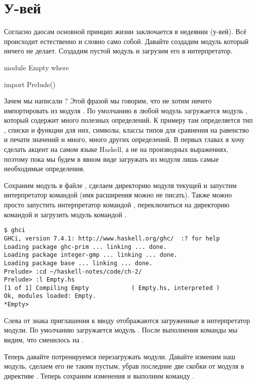 \section{У-вей}

Согласно даосам основной принцип жизни заключается в недеянии (у-вей).
Всё происходит естественно и словно само собой. Давайте создадим модуль
который ничего не делает. Создадим пустой модуль и загрузим его в
интерпретатор.


\begin{code}
module Empty where

import Prelude()
\end{code}

Зачем мы написали ? Этой фразой мы говорим, что не
хотим ничего импортировать из модуля . По умолчанию в любой
модуль загружается модуль , который содержит много полезных
определений. К примеру там определяется тип , списки и функции
для них, символы, классы типов для сравнения на равенство и печати
значений и много, много других определений. В первых главах я хочу
сделать акцент на самом языке Haskell, а не на производных выражениях,
поэтому пока мы будем в явном виде загружать из модуля  лишь
самые необходимые определения.

Сохраним модуль в файле , сделаем директорию модуля текущей
и запустим интерпретатор командой  (имя расширения можно
не писать). Также можно просто запустить интерпретатор командой
, переключиться на директорию командой  и загрузить
модуль командой .


\begin{verbatim}
$ ghci
GHCi, version 7.4.1: http://www.haskell.org/ghc/  :? for help
Loading package ghc-prim ... linking ... done.
Loading package integer-gmp ... linking ... done.
Loading package base ... linking ... done.
Prelude> :cd ~/haskell-notes/code/ch-2/
Prelude> :l Empty.hs 
[1 of 1] Compiling Empty            ( Empty.hs, interpreted )
Ok, modules loaded: Empty.
*Empty> 
\end{verbatim}

Слева от знака приглашения к вводу \In{>} отображаются загруженные в
интерпретатор модули. По умолчанию загружается модуль .
После выполнения команды  мы видим, что  сменилось на
.

Теперь давайте потренируемся перезагружать модули. Давайте изменим наш
модуль, сделаем его не таким пустым, убрав последние две скобки от
модуля  в директиве . Теперь сохраним изменения и
выполним команду .


